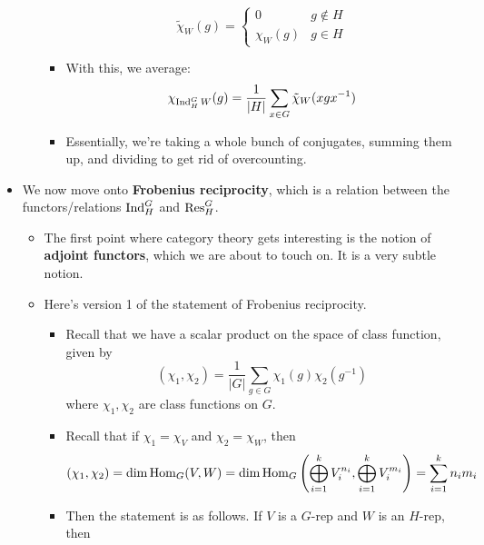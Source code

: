 \documentclass[../notes.tex]{subfiles}
\begin{document}
\begin{itemize}
\begin{itemize}
\begin{itemize}
            \begin{equation*}
                \tilde{\chi}_W(g) =
                \begin{cases}
                    0 & g\notin H\\
                    \chi_W(g) & g\in H
                \end{cases}
            \end{equation*}
            \item With this, we average:
            \begin{equation*}
                \chi_{\operatorname{Ind}_H^GW}(g) = \frac{1}{|H|}\sum_{x\in G}\tilde{\chi}_W(xgx^{-1})
            \end{equation*}
            \item Essentially, we're taking a whole bunch of conjugates, summing them up, and dividing to get rid of overcounting.
        \end{itemize}
    \end{itemize}
    \item We now move onto \textbf{Frobenius reciprocity}, which is a relation between the functors/relations $\operatorname{Ind}_H^G$ and $\operatorname{Res}_H^G$.
    \begin{itemize}
        \item The first point where category theory gets interesting is the notion of \textbf{adjoint functors}, which we are about to touch on. It is a very subtle notion.
        \item Here's version 1 of the statement of Frobenius reciprocity.
        \begin{itemize}
            \item Recall that we have a scalar product on the space of class function, given by
            \begin{equation*}
                (\chi_1,\chi_2) = \frac{1}{|G|}\sum_{g\in G}\chi_1(g)\chi_2(g^{-1})
            \end{equation*}
            where $\chi_1,\chi_2$ are class functions on $G$.
            \item Recall that if $\chi_1=\chi_V$ and $\chi_2=\chi_W$, then
            \begin{equation*}
                (\chi_1,\chi_2) = \dim\operatorname{Hom}_G(V,W)
                = \dim\operatorname{Hom}_G\left( \bigoplus_{i=1}^kV_i^{n_i},\bigoplus_{i=1}^kV_i^{m_i} \right)
                = \sum_{i=1}^kn_im_i
            \end{equation*}
            \item Then the statement is as follows. If $V$ is a $G$-rep and $W$ is an $H$-rep, then

\end{itemize}
\end{itemize}
\end{itemize}
\end{document}
